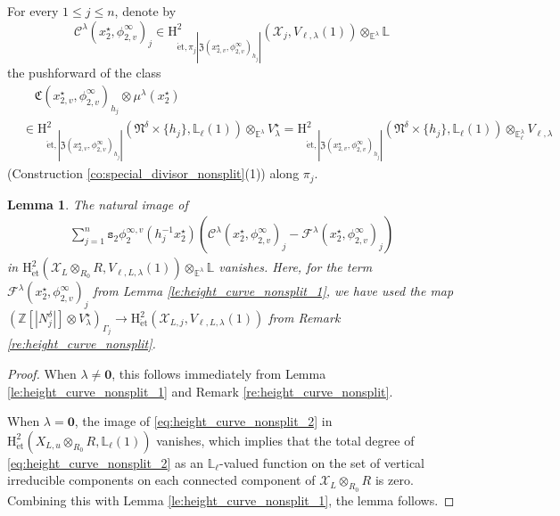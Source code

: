 \documentclass[12pt]{amsart}
\numberwithin{equation}{section}
\theoremstyle{plain}
\newtheorem{lem}[proposition]{Lemma}
\theoremstyle{definition}
\theoremstyle{remark}
\renewcommand{\b}[1]{\mathbf{#1}}
\renewcommand{\c}[1]{\mathcal{#1}}
\renewcommand{\d}[1]{\mathbb{#1}}
\newcommand{\f}[1]{\mathfrak{#1}}
\renewcommand{\r}[1]{\mathrm{#1}}
\renewcommand{\(}{\left(}
\renewcommand{\)}{\right)}
\renewcommand{\leq}{\leqslant}
\newcommand{\cC}{\c C}
\newcommand{\cF}{\c F}
\newcommand{\cX}{\c X}
\newcommand{\dE}{\d E}
\newcommand{\dL}{\d L}
\newcommand{\dZ}{\d Z}
\newcommand{\fC}{\f C}
\newcommand{\fN}{\f N}
\newcommand{\fZ}{\f Z}
\newcommand{\rH}{\r H}
\newcommand{\ts}{\mathtt{s}}
\newcommand{\et}{{\acute{\r{e}}\r{t}}}
\begin{document}
For every $1\leq j\leq n$, denote by
\[
\cC^\lambda(x^\star_2,\phi^\infty_{2,v})_j\in
\rH^2_{\et,\pi_j|\fZ(x^\star_{2,v},\phi^\infty_{2,v})_{h_j}|}(\cX_j,V_{\ell,\lambda}(1))\otimes_{\dE^\lambda}\dL
\]
the pushforward of the class
\begin{align*}
&\quad\fC(x^\star_{2,v},\phi^\infty_{2,v})_{h_j}\otimes\mu^\lambda(x^\star_2) \\
&\in\rH^2_{\et,|\fZ(x^\star_{2,v},\phi^\infty_{2,v})_{h_j}|}(\fN^\delta\times\{h_j\},\dL_\ell(1))
\otimes_{\dE^\lambda}V^\star_\lambda
=\rH^2_{\et,|\fZ(x^\star_{2,v},\phi^\infty_{2,v})_{h_j}|}(\fN^\delta\times\{h_j\},\dL_\ell(1))
\otimes_{\dE^\lambda_\ell}V_{\ell,\lambda}
\end{align*}
(Construction \ref{co:special_divisor_nonsplit}(1)) along $\pi_j$.





\begin{lem}\label{le:height_curve_nonsplit_3}
The natural image of
\begin{align}\label{eq:height_curve_nonsplit_2}
\sum_{j=1}^n\ts_2\phi^{\infty,v}_2(h_j^{-1}x^\star_2)
\(\cC^\lambda(x^\star_2,\phi^\infty_{2,v})_j-\cF^\lambda(x^\star_2,\phi^\infty_{2,v})_j\)
\end{align}
in $\rH^2_{\et}(\cX_L\otimes_{R_0}R,V_{\ell,L,\lambda}(1))\otimes_{\dE^\lambda}\dL$ vanishes. Here, for the term $\cF^\lambda(x^\star_2,\phi^\infty_{2,v})_j$ from Lemma \ref{le:height_curve_nonsplit_1}, we have used the map $\(\dZ[|N^\delta_j|]\otimes V^\star_\lambda\)_{\Gamma_j}\to\rH^2_{\et}(\cX_{L,j},V_{\ell,L,\lambda}(1))$ from Remark \ref{re:height_curve_nonsplit}.
\end{lem}

\begin{proof}
When $\lambda\neq\b{0}$, this follows immediately from Lemma \ref{le:height_curve_nonsplit_1} and Remark \ref{re:height_curve_nonsplit}.

When $\lambda=\b{0}$, the image of \eqref{eq:height_curve_nonsplit_2} in $\rH^2_{\et}(X_{L,u}\otimes_{R_0}R,\dL_\ell(1))$ vanishes, which implies that the total degree of \eqref{eq:height_curve_nonsplit_2} as an $\dL_\ell$-valued function on the set of vertical irreducible components on each connected component of $\cX_L\otimes_{R_0}R$ is zero. Combining this with Lemma \ref{le:height_curve_nonsplit_1}, the lemma follows.
\end{proof}
\end{document}
